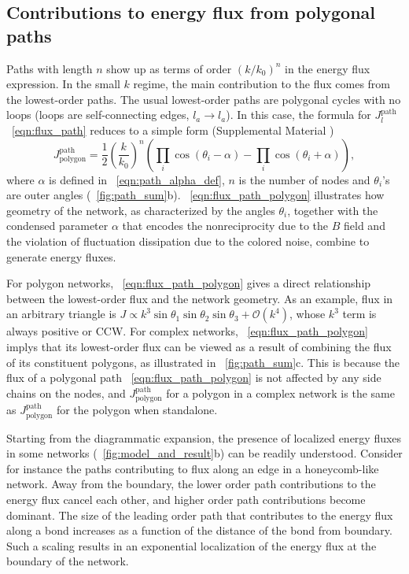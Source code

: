 \documentclass[
 preprint,
 preprintnumbers,
 amsmath,amssymb,
 aps,
 pre,
 longbibliography,
 superscriptaddress,
 10pt, twocolumn
]{revtex4-1}
\begin{document}
\subsection{Contributions to energy flux from polygonal paths}
Paths with length $n$ show up as terms of order $(k/k_0)^n$ in the energy flux expression. In the small $k$ regime, the main contribution to the flux comes from the lowest-order paths.
The usual lowest-order paths are polygonal cycles with no loops (loops are self-connecting edges, $l_a\rightarrow l_a$). In this case, the formula for $J^\text{path}_l$ \eqnname~\eqref{eqn:flux_path} reduces to a simple form (Supplemental Material \cite{SupplementalMaterial})
\begin{equation} \label{eqn:flux_path_polygon}
    J^\text{path}_\text{polygon} = \frac{1}{2} (\frac{k}{k_0})^n (\prod_i \cos(\theta_i - \alpha) - \prod_i \cos(\theta_i + \alpha)),
\end{equation}
where $\alpha$ is defined in \eqnname~\eqref{eqn:path_alpha_def}, $n$ is the number of nodes and $\theta_i$'s are outer angles (\figurename~\ref{fig:path_sum}b).
\eqnname~\ref{eqn:flux_path_polygon} illustrates how geometry of the network, as characterized by the angles $\theta_i$, together with the condensed parameter $\alpha$ that encodes the nonreciprocity due to the $B$ field and the violation of fluctuation dissipation due to the colored noise, combine to generate energy fluxes.

For polygon networks, \eqnname~\eqref{eqn:flux_path_polygon} gives a direct relationship between the lowest-order flux and the network geometry. As an example, flux in an arbitrary triangle is $J \propto k^3 \sin\theta_1\sin\theta_2\sin\theta_3 + \mathcal{O}(k^4)$, whose $k^3$ term is always positive or CCW.
For complex networks, \eqnname~\eqref{eqn:flux_path_polygon} implys that its lowest-order flux can be viewed as a result of combining the flux of its constituent polygons, as illustrated in \figurename~\ref{fig:path_sum}c. This is because the flux of a polygonal path \eqnname~\eqref{eqn:flux_path_polygon} is not affected by any side chains on the nodes, and $J^\text{path}_\text{polygon}$ for a polygon in a complex network is the same as $J^\text{path}_\text{polygon}$ for the polygon when standalone.

Starting from the  diagrammatic expansion, the presence of localized energy fluxes in some networks (\figurename~\ref{fig:model_and_result}b) can be readily understood. Consider for instance the paths contributing to flux along an edge in a honeycomb-like network. Away from the boundary, the lower order path contributions to the energy flux cancel each other, and higher order path contributions become dominant. The size of the leading order path that contributes to the energy flux along a bond increases as a function of the distance of the bond from boundary. Such a scaling results in an exponential localization of the energy flux at the boundary of the network.
\end{document}
